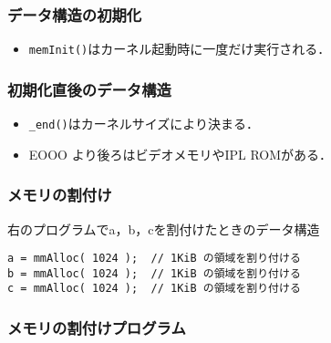 \documentclass[handout]{beamer}                   %
\begin{document}
\begin{frame}
  \frametitle{データ構造の初期化}
  \begin{itemize}
  \item {\tt memInit()}はカーネル起動時に一度だけ実行される．
  \end{itemize}
\end{frame}

\begin{frame}
  \frametitle{初期化直後のデータ構造}
  \begin{itemize}
  \item {\tt \_end()}はカーネルサイズにより決まる．
  \item EOOO より後ろはビデオメモリやIPL ROMがある．
  \end{itemize}
\end{frame}

\begin{frame}[fragile]
  \frametitle{メモリの割付け}
  右のプログラムでa，b，cを割付けたときのデータ構造
  \begin{center}
    \begin{minipage}{0.39\columnwidth}
    \end{minipage}
    \begin{minipage}{0.59\columnwidth}
      \begin{lstlisting}
a = mmAlloc( 1024 );  // 1KiB の領域を割り付ける
b = mmAlloc( 1024 );  // 1KiB の領域を割り付ける
c = mmAlloc( 1024 );  // 1KiB の領域を割り付ける
      \end{lstlisting}
    \end{minipage}
  \end{center}
  \vfill
\end{frame}

\begin{frame}
  \frametitle{メモリの割付けプログラム}
\end{frame}
\end{document}
